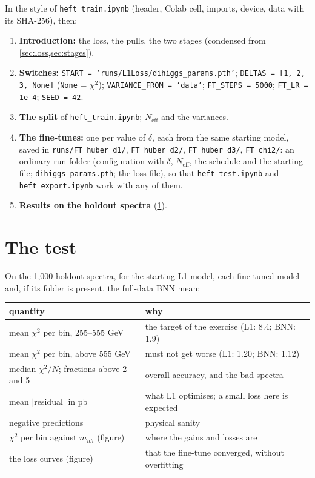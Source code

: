 \documentclass[11pt]{article}
\newcommand{\file}[1]{\nolinkurl{#1}}
\newcommand{\code}[1]{\texttt{#1}}
\newcommand{\mhh}{m_{hh}}
\begin{document}
In the style of \file{heft_train.ipynb} (header, Colab cell, imports, device, data with its
SHA-256), then:
\begin{enumerate}
  \item \textbf{Introduction:} the loss, the pulls, the two stages (condensed from
    \cref{sec:loss,sec:stages}).
  \item \textbf{Switches:} \code{START = 'runs/L1Loss/dihiggs\_params.pth'};
    \code{DELTAS = [1, 2, 3, None]} (\code{None} = $\chi^2$);
    \code{VARIANCE\_FROM = 'data'}; \code{FT\_STEPS = 5000}; \code{FT\_LR = 1e-4};
    \code{SEED = 42}.
  \item \textbf{The split} of \file{heft_train.ipynb}; $N_\text{eff}$ and the variances.
  \item \textbf{The fine-tunes:} one per value of $\delta$, each from the same starting
    model, saved in \file{runs/FT_huber_d1/}, \file{FT_huber_d2/}, \file{FT_huber_d3/},
    \file{FT_chi2/}: an ordinary run folder (configuration with $\delta$, $N_\text{eff}$,
    the schedule and the starting file; \file{dihiggs_params.pth}; the loss file), so that
    \file{heft_test.ipynb} and \file{heft_export.ipynb} work with any of them.
  \item \textbf{Results on the holdout spectra} (\cref{sec:test}).
\end{enumerate}

\section{The test}
\label{sec:test}

On the 1,000 holdout spectra, for the starting L1 model, each fine-tuned model and, if its
folder is present, the full-data BNN mean:

\begin{center}
\small
\begin{tabular}{p{}p{}}
\toprule
quantity & why\\
\midrule
mean $\chi^2$ per bin, 255--555 GeV & the target of the exercise (L1: 8.4; BNN: 1.9)\\
mean $\chi^2$ per bin, above 555 GeV & must not get worse (L1: 1.20; BNN: 1.12)\\
median $\chi^2/N$; fractions above 2 and 5 & overall accuracy, and the bad spectra\\
mean $|$residual$|$ in pb & what L1 optimises; a small loss here is expected\\
negative predictions & physical sanity\\
$\chi^2$ per bin against $\mhh$ (figure) & where the gains and losses are\\
the loss curves (figure) & that the fine-tune converged, without overfitting\\
\bottomrule
\end{tabular}
\end{center}
\end{document}
